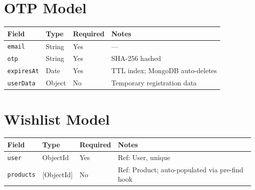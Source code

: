 \section{OTP Model}

\begin{longtable}{@{}p{3.5cm}p{3cm}p{2cm}p{5.5cm}@{}}
  \toprule
  \textbf{Field} & \textbf{Type} & \textbf{Required} & \textbf{Notes} \\
  \midrule
  \texttt{email}     & String & Yes & --- \\
  \texttt{otp}       & String & Yes & SHA-256 hashed \\
  \texttt{expiresAt} & Date   & Yes & TTL index; MongoDB auto-deletes \\
  \texttt{userData}  & Object & No  & Temporary registration data \\
  \bottomrule
\end{longtable}

\section{Wishlist Model}

\begin{longtable}{@{}p{3.5cm}p{3.5cm}p{2cm}p{5cm}@{}}
  \toprule
  \textbf{Field} & \textbf{Type} & \textbf{Required} & \textbf{Notes} \\
  \midrule
  \texttt{user}     & ObjectId   & Yes & Ref: User, unique \\
  \texttt{products} & [ObjectId] & No  & Ref: Product; auto-populated via pre-find hook \\
  \bottomrule
\end{longtable}
